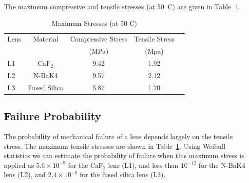 \documentclass{article}
\newcommand{\CaF}{\ensuremath{\mathrm{CaF_2}}}
\begin{document}
The maximum compressive and tensile stresses (at 50~C) are given in Table~\ref{table:stress}.

\begin{table}
\caption{Maximum Stresses (at 50 C)}
\label{table:stress}
\begin{center}
\small
\begin{tabular}{lcccc}
\hline
\hline
Lens&Material&Compressive Stress&Tensile Stress\\
&&(MPa)&(Mpa)\\
\hline
L1 &{\CaF}&9.42&1.92\\
L2 &N-BaK4&9.57&2.12\\
L3 &Fused Silica&5.87&1.70\\
\hline
\end{tabular}
\end{center}
\end{table}

\subsection{Failure Probability}

%
%
%
%
%
%
%
%
%

The probability of mechanical failure of a lens depends largely on the tensile stress. The maximum tensile stresses are shown in Table~\ref{table:stress}. Using Weibull statistics we can estimate the probability of failure when this maximum stress is applied as $5.6 \times 10^{-9}$ for the {\CaF} lens (L1), and less than $10^{-12}$ for the N-BaK4 lens (L2), and $2.4 \times 10^{-8}$ for the fused silica lens (L3).
\end{document}

